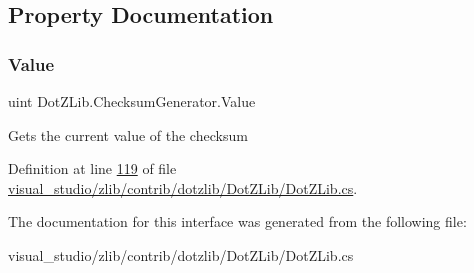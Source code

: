 \subsection{Property Documentation}
\mbox{\label{interface_dot_z_lib_1_1_checksum_generator_a9da6eca33adb6bfe5dfc260797e07f49}} 
\subsubsection{\texorpdfstring{Value}{Value}}
{\footnotesize\ttfamily uint Dot\+Z\+Lib.\+Checksum\+Generator.\+Value\hspace{0.3cm}{\ttfamily [get]}}



Gets the current value of the checksum 



Definition at line \hyperlink{visual__studio_2zlib_2contrib_2dotzlib_2_dot_z_lib_2_dot_z_lib_8cs_source_l00119}{119} of file \hyperlink{visual__studio_2zlib_2contrib_2dotzlib_2_dot_z_lib_2_dot_z_lib_8cs_source}{visual\+\_\+studio/zlib/contrib/dotzlib/\+Dot\+Z\+Lib/\+Dot\+Z\+Lib.\+cs}.



The documentation for this interface was generated from the following file\+:\begin{DoxyCompactItemize}
\item 
visual\+\_\+studio/zlib/contrib/dotzlib/\+Dot\+Z\+Lib/\+Dot\+Z\+Lib.\+cs\end{DoxyCompactItemize}
